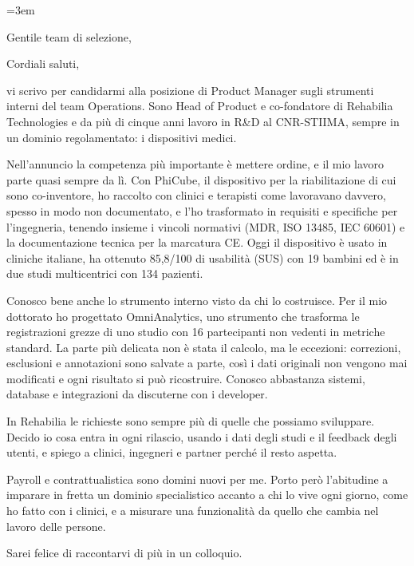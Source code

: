\documentclass[11pt,a4paper,sans]{moderncv}
\begin{document}
  \emergencystretch=3em


\date{16 ottobre 2026}
\opening{Gentile team di selezione,}
\closing{Cordiali saluti,}
\makelettertitle

vi scrivo per candidarmi alla posizione di Product Manager sugli strumenti interni del team Operations. Sono Head of Product e co-fondatore di Rehabilia Technologies e da più di cinque anni lavoro in R\&D al CNR-STIIMA, sempre in un dominio regolamentato: i dispositivi medici.

Nell'annuncio la competenza più importante è mettere ordine, e il mio lavoro parte quasi sempre da lì. Con PhiCube, il dispositivo per la riabilitazione di cui sono co-inventore, ho raccolto con clinici e terapisti come lavoravano davvero, spesso in modo non documentato, e l'ho trasformato in requisiti e specifiche per l'ingegneria, tenendo insieme i vincoli normativi (MDR, ISO 13485, IEC 60601) e la documentazione tecnica per la marcatura CE. Oggi il dispositivo è usato in cliniche italiane, ha ottenuto 85,8/100 di usabilità (SUS) con 19 bambini ed è in due studi multicentrici con 134 pazienti.

Conosco bene anche lo strumento interno visto da chi lo costruisce. Per il mio dottorato ho progettato OmniAnalytics, uno strumento che trasforma le registrazioni grezze di uno studio con 16 partecipanti non vedenti in metriche standard. La parte più delicata non è stata il calcolo, ma le eccezioni: correzioni, esclusioni e annotazioni sono salvate a parte, così i dati originali non vengono mai modificati e ogni risultato si può ricostruire. Conosco abbastanza sistemi, database e integrazioni da discuterne con i developer.

In Rehabilia le richieste sono sempre più di quelle che possiamo sviluppare. Decido io cosa entra in ogni rilascio, usando i dati degli studi e il feedback degli utenti, e spiego a clinici, ingegneri e partner perché il resto aspetta.

Payroll e contrattualistica sono domini nuovi per me. Porto però l'abitudine a imparare in fretta un dominio specialistico accanto a chi lo vive ogni giorno, come ho fatto con i clinici, e a misurare una funzionalità da quello che cambia nel lavoro delle persone.

Sarei felice di raccontarvi di più in un colloquio.

\makeletterclosing
\end{document}
